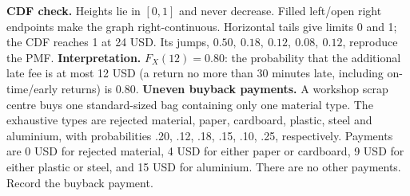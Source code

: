   \hfill%
  \begin{minipage}[t]{.60\linewidth}%
    \vspace{0pt}\centering
  \end{minipage}%
  \par
  \textbf{CDF check.} Heights lie in $[0,1]$ and never decrease. Filled left/open right endpoints make the
  graph right-continuous. Horizontal tails give limits 0 and 1; the CDF reaches 1 at 24 USD. Its jumps,
  $0.50,\ 0.18,\ 0.12,\ 0.08,\ 0.12$, reproduce the PMF.
  \textbf{Interpretation.} $F_X(12)=0.80$: the probability that the additional late fee is at most 12 USD
  (a return no more than 30 minutes late, including on-time/early returns) is 0.80.
  \endgroup
  \vfill
  \clearpage
  \textbf{Uneven buyback payments.} A workshop scrap centre buys one standard-sized bag containing only one
  material type. The exhaustive types are rejected material, paper, cardboard, plastic, steel and aluminium,
  with probabilities .20, .12, .18, .15, .10, .25, respectively. Payments are 0 USD for rejected material, 4 USD
  for either paper or cardboard, 9 USD for either plastic or steel, and 15 USD for aluminium. There are no other
  payments. Record the buyback payment.
